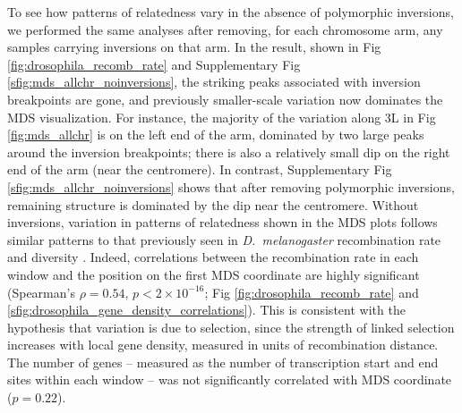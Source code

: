 \documentclass[11pt, oneside]{article}   	%
\newcommand\citep{\cite}
\newcommand{\Figure}{Fig }
\newcommand{\Figures}{Fig }
\newcommand{\Figure}{{Figure }}
\newcommand{\Figures}{{Figures }}
\begin{document}
To see how patterns of relatedness vary in the absence of polymorphic inversions,
we performed the same analyses after removing, for each chromosome arm,
any samples carrying inversions on that arm.
In the result, shown in \Figure \ref{fig:drosophila_recomb_rate} and
Supplementary \Figure \ref{sfig:mds_allchr_noinversions},
the striking peaks associated with inversion breakpoints are gone,
and previously smaller-scale variation now dominates the MDS visualization.
For instance, the majority of the variation along 3L in \Figure \ref{fig:mds_allchr}
is on the left end of the arm, dominated by two large peaks around the inversion breakpoints;
there is also a relatively small dip on the right end of the arm (near the centromere).
In contrast, Supplementary \Figure \ref{sfig:mds_allchr_noinversions} shows that after removing polymorphic inversions,
remaining structure is dominated by the dip near the centromere.
Without inversions, variation in patterns of relatedness shown in the MDS plots
follows similar patterns to that previously seen in \textit{D.~melanogaster} recombination rate and diversity \citep{langley2012genomic,mackay2012drosophila}.
Indeed, correlations between the recombination rate in each window and the position on the first MDS coordinate are highly significant
(Spearman's $\rho=0.54$, $p<2 \times 10^{-16}$; \Figures \ref{fig:drosophila_recomb_rate} and \ref{sfig:drosophila_gene_density_correlations}).
This is consistent with the hypothesis that variation
is due to selection, since the strength of linked selection increases with local gene density, 
measured in units of recombination distance.
The number of genes -- measured as the number of transcription start and end sites within each window --
was not significantly correlated with MDS coordinate ($p=0.22$).
\end{document}
